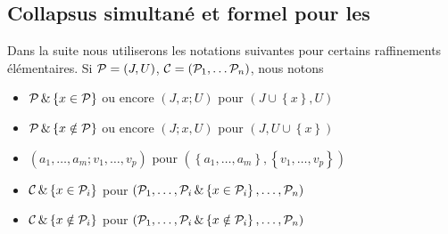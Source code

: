 \subsection{Collapsus simultané et \nst formel pour les \procs} 
\label{subsecColsim}
\begin{notations} 
\label{notaAjou}
{\rm  Dans la suite nous utiliserons les notations suivantes
pour certains raffinements élémentaires.
Si ${\cal P}=(J,U)$, ${\cal C}=({\cal P}_1,\ldots {\cal P}_n)$, nous notons
\begin{itemize}
%
\item  ${\cal P}\,\&\left\{{x\in {\cal P}}\right\}$ ou encore $(J,x;U)$ 
pour $(J\cup \left\{x\right\}, U)$ 
%
\item ${\cal P}\,\&\left\{{x\notin{\cal P}}\right\}$  ou encore $(J;x,U)$
pour $(J,U\cup \left\{x\right\})$ 
%
\item  $(a_1,\ldots ,a_m;v_1,\ldots,v_p)$ pour 
$(\left\{a_1,\ldots ,a_m\right\},\left\{v_1,\ldots,v_p\right\})$ 
%
\item ${\cal C}\,\&\left\{{x\in {\cal P}_i}\right\}$ pour $({\cal P}_1,\ldots,{\cal P}_i\,\&\left\{{x\in {\cal P}_i}\right\},\ldots, {\cal P}_n)$  
%
\item   ${\cal C}\,\&\left\{{x\notin {\cal P}_i}\right\}$ pour $({\cal P}_1,\ldots,{\cal P}_i\,\&\left\{{x\notin {\cal P}_i}\right\},\ldots, {\cal P}_n)$
%
\end{itemize}
} 
\end{notations}

 




